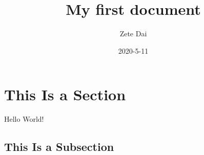 \documentclass{article}
\title{My first document}
\date{2020-5-11}
\author{Zete Dai}
\begin{document}
\maketitle
{}
\newpage
{}

\section{This Is a Section}
Hello World!
\subsection{This Is a Subsection}
\end{document}
